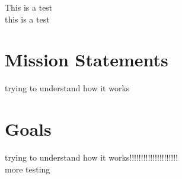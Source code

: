 
This is a test\ \\ 
this is a test

\section{Mission Statements}
\label{sec:mission-statements}
trying to understand how it works\ \\

\section{Goals}
\label{sec:goals}



trying to understand how it works!!!!!!!!!!!!!!!!!!!!!\ \\
more testing \ \\

